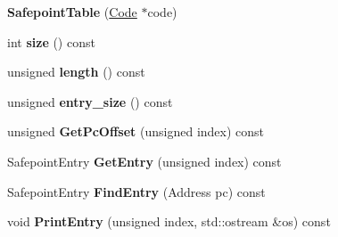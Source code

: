 \begin{DoxyCompactItemize}
\item 
{\bfseries Safepoint\+Table} (\hyperlink{classv8_1_1internal_1_1_code}{Code} $\ast$code)\hypertarget{classv8_1_1internal_1_1_b_a_s_e___e_m_b_e_d_d_e_d_a398764d1b4816d028cfcd90eb845fa19}{}\label{classv8_1_1internal_1_1_b_a_s_e___e_m_b_e_d_d_e_d_a398764d1b4816d028cfcd90eb845fa19}

\item 
int {\bfseries size} () const \hypertarget{classv8_1_1internal_1_1_b_a_s_e___e_m_b_e_d_d_e_d_a50231b3c6146ef7da5956179309d5e90}{}\label{classv8_1_1internal_1_1_b_a_s_e___e_m_b_e_d_d_e_d_a50231b3c6146ef7da5956179309d5e90}

\item 
unsigned {\bfseries length} () const \hypertarget{classv8_1_1internal_1_1_b_a_s_e___e_m_b_e_d_d_e_d_a0cbbade27afedb949b51d47d6691764a}{}\label{classv8_1_1internal_1_1_b_a_s_e___e_m_b_e_d_d_e_d_a0cbbade27afedb949b51d47d6691764a}

\item 
unsigned {\bfseries entry\+\_\+size} () const \hypertarget{classv8_1_1internal_1_1_b_a_s_e___e_m_b_e_d_d_e_d_afd7c7532fce1333bd1ca7616e7dd9d35}{}\label{classv8_1_1internal_1_1_b_a_s_e___e_m_b_e_d_d_e_d_afd7c7532fce1333bd1ca7616e7dd9d35}

\item 
unsigned {\bfseries Get\+Pc\+Offset} (unsigned index) const \hypertarget{classv8_1_1internal_1_1_b_a_s_e___e_m_b_e_d_d_e_d_a4fe7e91ab8c440588d26a88bcb622673}{}\label{classv8_1_1internal_1_1_b_a_s_e___e_m_b_e_d_d_e_d_a4fe7e91ab8c440588d26a88bcb622673}

\item 
Safepoint\+Entry {\bfseries Get\+Entry} (unsigned index) const \hypertarget{classv8_1_1internal_1_1_b_a_s_e___e_m_b_e_d_d_e_d_a6ed5eed23219ab4db8ec49ace2bc8237}{}\label{classv8_1_1internal_1_1_b_a_s_e___e_m_b_e_d_d_e_d_a6ed5eed23219ab4db8ec49ace2bc8237}

\item 
Safepoint\+Entry {\bfseries Find\+Entry} (Address pc) const \hypertarget{classv8_1_1internal_1_1_b_a_s_e___e_m_b_e_d_d_e_d_a1b1069b8e5473f264d01f7de97d9c3cf}{}\label{classv8_1_1internal_1_1_b_a_s_e___e_m_b_e_d_d_e_d_a1b1069b8e5473f264d01f7de97d9c3cf}

\item 
void {\bfseries Print\+Entry} (unsigned index, std\+::ostream \&os) const \hypertarget{classv8_1_1internal_1_1_b_a_s_e___e_m_b_e_d_d_e_d_a108bd828fd72103d0cdb47890177613f}{}\label{classv8_1_1internal_1_1_b_a_s_e___e_m_b_e_d_d_e_d_a108bd828fd72103d0cdb47890177613f}


\end{DoxyCompactItemize}
